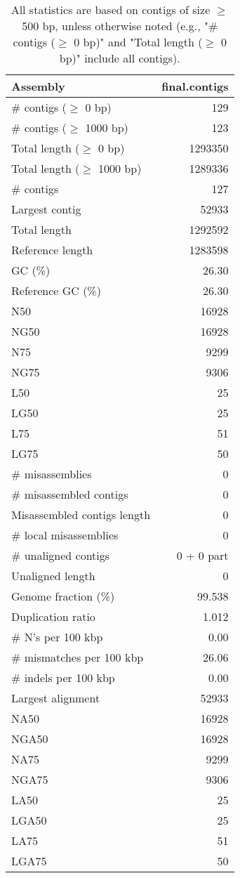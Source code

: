 \documentclass[12pt,a4paper]{article}
\begin{document}
\begin{table}[ht]
\begin{center}
\caption{All statistics are based on contigs of size $\geq$ 500 bp, unless otherwise noted (e.g., "\# contigs ($\geq$ 0 bp)" and "Total length ($\geq$ 0 bp)" include all contigs).}
\begin{tabular}{|l*{1}{|r}|}
\hline
Assembly & final.contigs \\ \hline
\# contigs ($\geq$ 0 bp) & 129 \\ \hline
\# contigs ($\geq$ 1000 bp) & 123 \\ \hline
Total length ($\geq$ 0 bp) & 1293350 \\ \hline
Total length ($\geq$ 1000 bp) & 1289336 \\ \hline
\# contigs & 127 \\ \hline
Largest contig & 52933 \\ \hline
Total length & 1292592 \\ \hline
Reference length & 1283598 \\ \hline
GC (\%) & 26.30 \\ \hline
Reference GC (\%) & 26.30 \\ \hline
N50 & 16928 \\ \hline
NG50 & 16928 \\ \hline
N75 & 9299 \\ \hline
NG75 & 9306 \\ \hline
L50 & 25 \\ \hline
LG50 & 25 \\ \hline
L75 & 51 \\ \hline
LG75 & 50 \\ \hline
\# misassemblies & 0 \\ \hline
\# misassembled contigs & 0 \\ \hline
Misassembled contigs length & 0 \\ \hline
\# local misassemblies & 0 \\ \hline
\# unaligned contigs & 0 + 0 part \\ \hline
Unaligned length & 0 \\ \hline
Genome fraction (\%) & 99.538 \\ \hline
Duplication ratio & 1.012 \\ \hline
\# N's per 100 kbp & 0.00 \\ \hline
\# mismatches per 100 kbp & 26.06 \\ \hline
\# indels per 100 kbp & 0.00 \\ \hline
Largest alignment & 52933 \\ \hline
NA50 & 16928 \\ \hline
NGA50 & 16928 \\ \hline
NA75 & 9299 \\ \hline
NGA75 & 9306 \\ \hline
LA50 & 25 \\ \hline
LGA50 & 25 \\ \hline
LA75 & 51 \\ \hline
LGA75 & 50 \\ \hline
\end{tabular}
\end{center}
\end{table}
\end{document}
